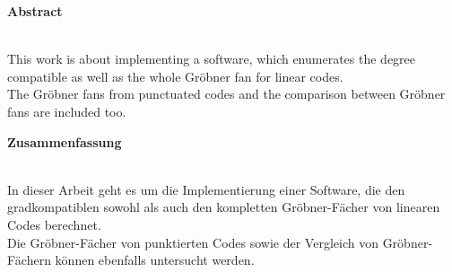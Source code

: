 

\begin{center}
\large \textbf{Abstract} \\
~\\ %
\end{center}
This work is about implementing a software, which enumerates the degree compatible as well as the whole Gröbner fan for linear codes. \\The Gröbner fans from punctuated codes and the comparison between Gröbner fans are included too.

\vfill %
\begin{center}
\large \textbf{Zusammenfassung} \\
~\\ %
\end{center}
In dieser Arbeit geht es um die Implementierung einer Software, die den gradkompatiblen sowohl als auch den kompletten Gröbner-Fächer von linearen Codes berechnet. \\Die Gröbner-Fächer von punktierten Codes sowie der Vergleich von Gröbner-Fächern können ebenfalls untersucht werden. 